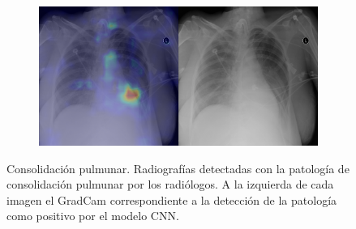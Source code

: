 \begin{figure}[b]
\begin{subfigure}{0.4\textwidth}
    \end{subfigure}
    \begin{subfigure}{0.4\textwidth}
        \centering
        \includegraphics[width=1.0\textwidth]{Chapters/5. Conclusiones/img/Consolidation/1_1_00018187_052.png}
    \end{subfigure}

    \caption{Consolidación pulmunar. Radiografías detectadas con la patología de consolidación pulmunar por los
                    radiólogos. A la izquierda de cada imagen el GradCam correspondiente a la detección
                    de la patología como positivo por el modelo CNN.}
\end{figure}

